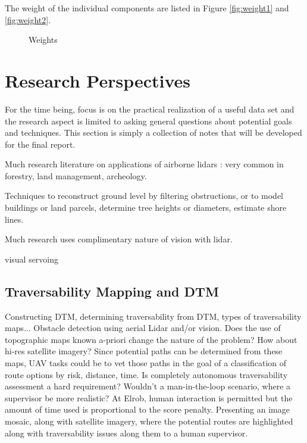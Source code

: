 \documentclass[a4paper,11pt]{report}
\begin{document}
The weight of the individual components are listed in Figure \ref{fig:weight1} and \ref{fig:weight2}.

\begin{figure}[ht]
  \centering
  \caption{Weights}
  \label{fig:weights}
\end{figure} 

\chapter{Research Perspectives}

For the time being, focus is on the practical realization of a useful data set and the research aspect is limited to asking general questions about potential goals and techniques. This section is simply a collection of notes that will be developed for the final report.

Much research literature on applications of airborne lidars : very common in forestry, land management, archeology.

Techniques to reconstruct ground level by filtering obstructions, or to model buildings or land parcels, determine tree heights or diameters, estimate shore lines.

Much research uses complimentary nature of vision with lidar. 

visual servoing

\section{Traversability Mapping and DTM}

Constructing DTM, determining traversability from DTM, types of traversability maps... Obstacle detection using aerial Lidar and/or vision. Does the use of topographic maps known a-priori change the nature of the problem? How about hi-res satellite imagery? Since potential paths can be determined from these maps, UAV tasks could be to vet those paths in the goal of a classification of route options by risk, distance, time. Is completely autonomous traversability assessment a hard requirement? Wouldn't a man-in-the-loop scenario, where a supervisor be more realistic? At Elrob, human interaction is permitted but the amount of time used is proportional to the score penalty. Presenting an image mosaic, along with satellite imagery, where the potential routes are highlighted along with traversability issues along them to a human supervisor. 
\end{document}
